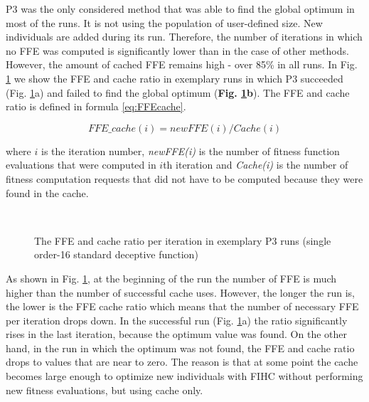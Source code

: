 P3 was the only considered method that was able to find the global optimum in most of the runs. It is not using the population of user-defined size. New individuals are added during its run. Therefore, the number of iterations in which no FFE was computed is significantly lower than in the case of other methods. However, the amount of cached FFE remains high - over 85\% in all runs. In Fig. \ref{fig:ImmediateStuckDec3_P3} we show the FFE and cache ratio in exemplary runs in which P3 succeeded (Fig. \ref{fig:ImmediateStuckDec3_P3}a) and failed to find the global optimum (\textbf{Fig. \ref{fig:ImmediateStuckDec3_P3}b}). The FFE and cache ratio is defined in formula \ref{eq:FFEcache}.\par

\begin{equation}
\label{eq:FFEcache}
\mathit{FFE\_cache}(i) = newFFE(i)/Cache(i)
\end{equation}

where $i$ is the iteration number, \textit{newFFE(i)} is the number of fitness function evaluations that were computed in $i$th iteration and \textit{Cache(i)} is the number of fitness computation requests that did not have to be computed because they were found in the cache.


\begin{figure}[h]
	\label{fig:ImmediateStuckDec3_P3_succ}\hfill
	\label{fig:ImmediateStuckDec3_P3_fail}\\
	\caption{ The FFE and cache ratio per iteration in exemplary P3 runs (single order-16 standard deceptive function) }
	\label{fig:ImmediateStuckDec3_P3}
\end{figure}

As shown in Fig. \ref{fig:ImmediateStuckDec3_P3}, at the beginning of the run the number of FFE is much higher than the number of successful cache uses. However, the longer the run is, the lower is the FFE cache ratio which means that the number of necessary FFE per iteration drops down. In the successful run (Fig. \ref{fig:ImmediateStuckDec3_P3}a) the ratio significantly rises in the last iteration, because the optimum value was found. On the other hand, in the run in which the optimum was not found, the FFE and cache ratio drops to values that are near to zero. The reason is that at some point the cache becomes large enough to optimize new individuals with FIHC without performing new fitness evaluations, but using cache only.\par


